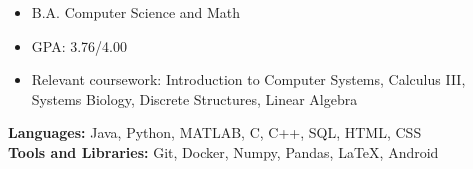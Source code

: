\documentclass[a4paper]{resume}
\begin{document}
\vspace*{-20pt}



\vspace{10pt}

\begin{itemize} \vspace{-5pt} \itemsep -2pt
	\item B.A. Computer Science and Math
	\item GPA: 3.76/4.00
	\item Relevant coursework: Introduction to Computer Systems, Calculus III, Systems Biology, Discrete Structures, Linear Algebra
\end{itemize}
\enresection

\vspace{-3pt}

\textbf{Languages:} Java, Python, MATLAB, C, C++, SQL, HTML, CSS \\
\textbf{Tools and Libraries:} Git, Docker, Numpy, Pandas, LaTeX, Android
\enresection
\end{document}
